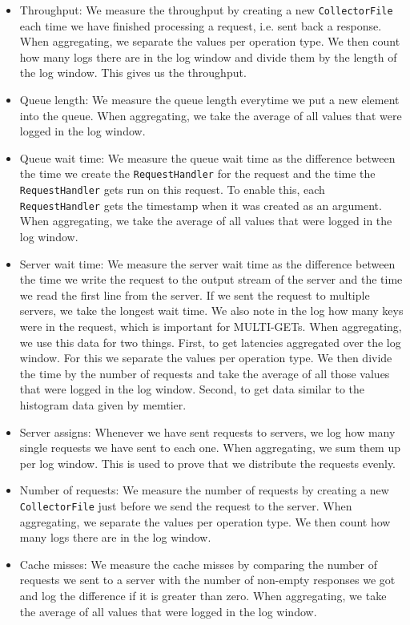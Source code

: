 \documentclass[11pt,a4paper]{article}
\newcommand{\co}[1]{\texttt{#1}}
\begin{document}
\begin{itemize}
	\item Throughput: We measure the throughput by creating a new \co{CollectorFile} each time we have finished processing a request, i.e. sent back a response. When aggregating, we separate the values per operation type. We then count how many logs there are in the log window and divide them by the length of the log window. This gives us the throughput.
	\item Queue length: We measure the queue length everytime we put a new element into the queue. When aggregating, we take the average of all values that were logged in the log window. 
	\item Queue wait time: We measure the queue wait time as the difference between the time we create the \co{RequestHandler} for the request and the time the \co{RequestHandler} gets run on this request. To enable this, each \co{RequestHandler} gets the timestamp when it was created as an argument. When aggregating, we take the average of all values that were logged in the log window. 
	\item Server wait time: We measure the server wait time as the difference between the time we write the request to the output stream of the server and the time we read the first line from the server. If we sent the request to multiple servers, we take the longest wait time. We also note in the log how many keys were in the request, which is important for MULTI-GETs. When aggregating, we use this data for two things. First, to get latencies aggregated over the log window. For this we separate the values per operation type. We then divide the time by the number of requests and take the average of all those values that were logged in the log window. Second, to get data similar to the histogram data given by memtier.
	\item Server assigns: Whenever we have sent requests to servers, we log how many single requests we have sent to each one. When aggregating, we sum them up per log window. This is used to prove that we distribute the requests evenly.
	\item Number of requests: We measure the number of requests by creating a new \co{CollectorFile} just before we send the request to the server. When aggregating, we separate the values per operation type. We then count how many logs there are in the log window. 
	\item Cache misses: We measure the cache misses by comparing the number of requests we sent to a server with the number of non-empty responses we got and log the difference if it is greater than zero. When aggregating, we take the average of all values that were logged in the log window. 

\end{itemize}
\end{document}
